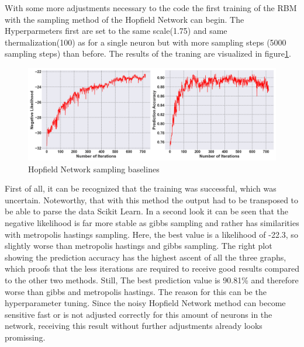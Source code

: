With some more adjustments necessary to the code the first training of the \ac{RBM} with the sampling method of the Hopfield Network can begin. 
The Hyperparmeters first are set to the same scale(1.75) and same thermalization(100) as for a single neuron but with more sampling steps (5000 sampling steps) than before. 
The results of the traning are visualized in figure\ref{HNN_training}.
\begin{figure}[H]
    \centering
    \includegraphics[width=1\linewidth]{graphics/HNN_combined_plot.png}
    \caption{Hopfield Network sampling baselines}
    \label{HNN_training}
\end{figure}
First of all, it can be recognized that the training was successful, which was uncertain. 
Noteworthy, that with this method the output had to be transposed to be able to parse the data Scikit Learn.
In a second look it can be seen that the negative likelihood is far more stable as gibbs sampling and rather has similarities with metropolis hastings sampling.
Here, the best value is a likelihood of -22.3, so slightly worse than metropolis hastings and gibbs sampling. 
The right plot showing the prediction accuracy has the highest ascent of all the three graphs, which proofs that the 
less iterations are required to receive good results compared to the other two methods.
Still, The best prediction value is 90.81\% and therefore worse than gibbs and metropolis hastings. 
The reason for this can be the hyperparameter tuning.
Since the noisy Hopfield Network method can become sensitive fast or is not adjusted correctly 
for this amount of neurons in the network, receiving this result without further adjustments already looks promissing. 

